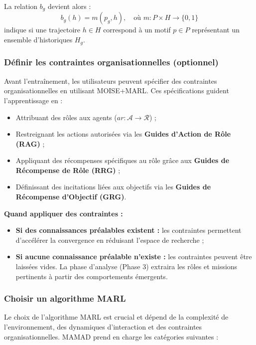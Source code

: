 \documentclass[pdflatex,sn-mathphys-num]{sn-jnl}%
\theoremstyle{thmstyleone}%
\theoremstyle{thmstyletwo}%
\theoremstyle{thmstylethree}%
\begin{document}
La relation $b_g$ devient alors :
\[
    b_g(h) = m(p_g, h), \quad \text{où } m: P \times H \to \{0,1\}
\]
indique si une trajectoire $h \in H$ correspond à un motif $p \in P$ représentant un ensemble d'historiques $H_g$.

\subsubsection{Définir les contraintes organisationnelles (optionnel)}

Avant l'entraînement, les utilisateurs peuvent spécifier des contraintes organisationnelles en utilisant MOISE+MARL. Ces spécifications guident l'apprentissage en :

\begin{itemize}
    \item Attribuant des rôles aux agents ($ar: \mathcal{A} \to \mathcal{R}$) ;
    \item Restreignant les actions autorisées via les \textbf{Guides d'Action de Rôle (RAG)} ;
    \item Appliquant des récompenses spécifiques au rôle grâce aux \textbf{Guides de Récompense de Rôle (RRG)} ;
    \item Définissant des incitations liées aux objectifs via les \textbf{Guides de Récompense d'Objectif (GRG)}.
\end{itemize}

\vspace{0.4em}
\noindent \textbf{Quand appliquer des contraintes :}
\begin{itemize}
    \item \textbf{Si des connaissances préalables existent :} les contraintes permettent d'accélérer la convergence en réduisant l'espace de recherche ;
    \item \textbf{Si aucune connaissance préalable n'existe :} les contraintes peuvent être laissées vides. La phase d'analyse (Phase 3) extraira les rôles et missions pertinents à partir des comportements émergents.
\end{itemize}

\subsubsection{Choisir un algorithme MARL}

Le choix de l'algorithme MARL est crucial et dépend de la complexité de l'environnement, des dynamiques d'interaction et des contraintes organisationnelles. MAMAD prend en charge les catégories suivantes :
\end{document}
